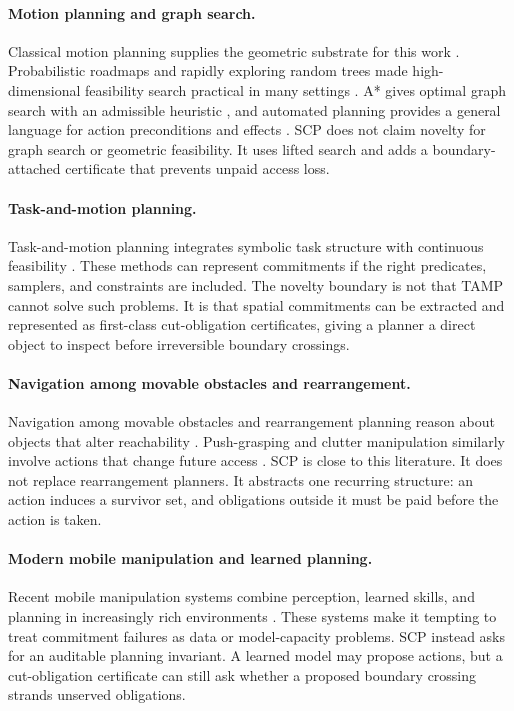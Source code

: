 \documentclass{article}
\begin{document}
\paragraph{Motion planning and graph search.}
Classical motion planning supplies the geometric substrate for this work \citep{lavalle2006planning}. Probabilistic roadmaps and rapidly exploring random trees made high-dimensional feasibility search practical in many settings \citep{kavraki1996probabilistic,lavalle1998rapidly}. A* gives optimal graph search with an admissible heuristic \citep{hart1968formal}, and automated planning provides a general language for action preconditions and effects \citep{ghallab2004automated}. SCP does not claim novelty for graph search or geometric feasibility. It uses lifted search and adds a boundary-attached certificate that prevents unpaid access loss.

\paragraph{Task-and-motion planning.}
Task-and-motion planning integrates symbolic task structure with continuous feasibility \citep{kaelbling2011hierarchical,srivastava2014combined,toussaint2015logic,garrett2021pddlstream,wolfe2010combined}. These methods can represent commitments if the right predicates, samplers, and constraints are included. The novelty boundary is not that TAMP cannot solve such problems. It is that spatial commitments can be extracted and represented as first-class cut-obligation certificates, giving a planner a direct object to inspect before irreversible boundary crossings.

\paragraph{Navigation among movable obstacles and rearrangement.}
Navigation among movable obstacles and rearrangement planning reason about objects that alter reachability \citep{stilman2005navigation,stilman2007manipulation,krontiris2015dealing}. Push-grasping and clutter manipulation similarly involve actions that change future access \citep{dogar2011pushgrasping,kimmel2018fast,kimmel2019anytime}. SCP is close to this literature. It does not replace rearrangement planners. It abstracts one recurring structure: an action induces a survivor set, and obligations outside it must be paid before the action is taken.

\paragraph{Modern mobile manipulation and learned planning.}
Recent mobile manipulation systems combine perception, learned skills, and planning in increasingly rich environments \citep{ehsani2021manipulathor,wang2021learning,zhang2022visually,huang2023skill,yan2025msupsup}. These systems make it tempting to treat commitment failures as data or model-capacity problems. SCP instead asks for an auditable planning invariant. A learned model may propose actions, but a cut-obligation certificate can still ask whether a proposed boundary crossing strands unserved obligations.
\end{document}
